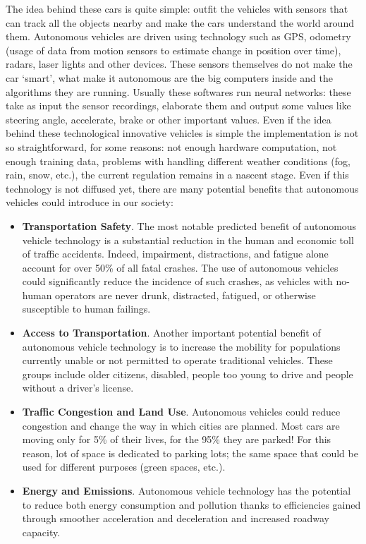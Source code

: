 \documentclass[14pt]{extarticle}
\def\ss{\vspace{25pt}}
\def\pp{\vspace{10pt}\newline}
\def\ppn{\vspace{10pt}}
\begin{document}
\begin{flushleft}
\ppn
The idea behind these cars is quite simple: outfit the vehicles with sensors that can track all the objects nearby and make the cars understand the world around them. Autonomous vehicles are driven using technology such as GPS, odometry (usage of data from motion sensors to estimate change in position over time), radars, laser lights and other devices\cite{AVlevels2}. These sensors themselves do not make the car ‘smart’, what make it autonomous are the big computers inside and the algorithms they are running. Usually these softwares run neural networks: these take as input the sensor recordings, elaborate them and output some values like steering angle, accelerate, brake or other important values. Even if the idea behind these technological innovative vehicles is simple the implementation is not so straightforward, for some reasons: not enough hardware computation, not enough training data, problems with handling different weather conditions (fog, rain, snow, etc.),  the current regulation remains in a nascent stage.
 \pp
Even if this technology is not diffused yet, there are many potential benefits that autonomous vehicles could introduce in our society:
 \begin{itemize}
 \item \textbf{Transportation Safety}. The most notable predicted benefit of autonomous vehicle technology is a substantial reduction in the human and economic toll of traffic accidents. Indeed, impairment, distractions, and fatigue alone account for over 50\% of all fatal crashes. The use of autonomous vehicles could significantly reduce the incidence of such crashes, as vehicles with no-human operators are never drunk, distracted, fatigued, or otherwise susceptible to human failings.
\item \textbf{Access to Transportation}. Another important potential benefit of autonomous vehicle technology is to increase the mobility for populations currently unable or not permitted to operate traditional vehicles. These groups include older
citizens, disabled, people too young to drive and people without a driver’s 
license.
\item \textbf{Traffic Congestion and Land Use}. Autonomous vehicles could reduce congestion and change the way in which cities are planned. Most cars are moving only for 5\% of their lives, for the 95\% they are parked\cite{AVparking}! For this reason, lot of space is dedicated to parking lots; the same space that could be used for different purposes (green spaces, etc.).
\item \textbf{Energy and Emissions}. Autonomous vehicle technology has the potential to reduce both energy consumption and pollution thanks to efficiencies gained through smoother acceleration and deceleration and  increased  roadway capacity.\cite{AVbenefit}
 \end{itemize}

	\ss
\end{flushleft}
\end{document}

